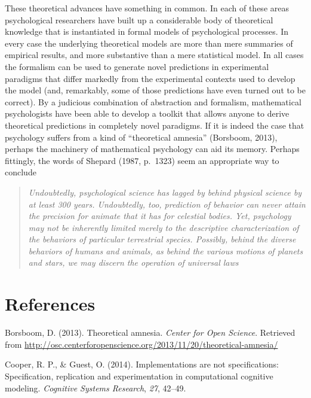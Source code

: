 \documentclass[
  english,
  doc]{apa6}
\begin{document}
These theoretical advances have something in common. In each of these areas psychological researchers have built up a considerable body of theoretical knowledge that is instantiated in formal models of psychological processes. In every case the underlying theoretical models are more than mere summaries of empirical results, and more substantive than a mere statistical model. In all cases the formalism can be used to generate novel predictions in experimental paradigms that differ markedly from the experimental contexts used to develop the model (and, remarkably, some of those predictions have even turned out to be correct). By a judicious combination of abstraction and formalism, mathematical psychologists have been able to develop a toolkit that allows anyone to derive theoretical predictions in completely novel paradigms. If it is indeed the case that psychology suffers from a kind of ``theoretical amnesia'' (Borsboom, 2013), perhaps the machinery of mathematical psychology can aid its memory. Perhaps fittingly, the words of Shepard (1987, p.~1323) seem an appropriate way to conclude

\begin{quote}
\emph{Undoubtedly, psychological science has lagged by behind physical science by at least 300 years. Undoubtedly, too, prediction of behavior can never attain the precision for animate that it has for celestial bodies. Yet, psychology may not be inherently limited merely to the descriptive characterization of the behaviors of particular terrestrial species. Possibly, behind the diverse behaviors of humans and animals, as behind the various motions of planets and stars, we may discern the operation of universal laws}
\end{quote}

\hypertarget{references}{%
\section{References}\label{references}}

\hypertarget{refs}{}
\leavevmode\hypertarget{ref-boorsbaum2013theoretical}{}%
Borsboom, D. (2013). Theoretical amnesia. \emph{Center for Open Science}. Retrieved from \url{http://osc.centerforopenscience.org/2013/11/20/theoretical-amnesia/}

\leavevmode\hypertarget{ref-cooper2014implementations}{}%
Cooper, R. P., \& Guest, O. (2014). Implementations are not specifications: Specification, replication and experimentation in computational cognitive modeling. \emph{Cognitive Systems Research}, \emph{27}, 42--49.
\end{document}
